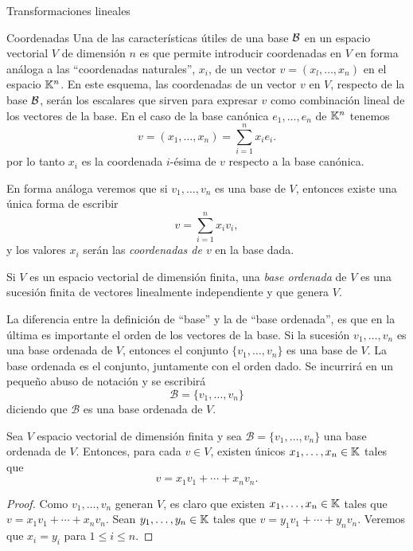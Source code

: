 \begin{chapter}{Transformaciones lineales}
        


    \begin{section}{Coordenadas}\label{seccion-coordenadas}
        Una de las características útiles de una base $\mathcal{B}$ en un espacio vectorial  $V$ de dimensión $n$ es que permite introducir coordenadas en $V$ en forma análoga a las ``coordenadas naturales'', $x_i$, de un vector $v = (x_l,\ldots, x_n)$ en el espacio $\mathbb K^n$. En este esquema, las coordenadas de un vector $v$ en $V$, respecto de la base $\mathcal{B}$, serán los escalares que sirven para expresar $v$ como combinación lineal de los vectores de la base. En  el caso  de la base canónica $e_1,\ldots,e_n$ de $\mathbb K^n$ tenemos
        $$
        v = (x_1,\ldots,x_n) = \sum_{i=1}^{n} x_ie_i.
        $$
        por lo tanto $x_i$  es la coordenada $i$-ésima de $v$ respecto a la base canónica. 
        
        En  forma análoga veremos que si $v_1,\ldots,v_n$  es una base de $V$,  entonces existe una única forma de  escribir 
        $$
        v =  \sum_{i=1}^{n} x_iv_i,
        $$ 
        y los valores  $x_i$  serán las \textit{coordenadas de $v$} en la base dada. 
        
        \begin{definicion}
            Si $V$ es un espacio vectorial de dimensión finita, una \textit{base ordenada} de $V$ es una sucesión finita de vectores linealmente independiente y que genera $V$.
        \end{definicion}
        
        
        La diferencia entre la definición de ``base'' y la de ``base ordenada'',  es que en la última es  importante el orden de los vectores de la base. Si la sucesión $v_1,\ldots,v_n$ es una base ordenada de $V$, entonces el conjunto $\{v_1,\ldots,v_n\}$ es una base de $V$. La base ordenada es el conjunto, juntamente con el orden dado. Se incurrirá en un pequeño abuso de notación y se escribirá
        $$
        \mathcal{B} = \{v_1,\ldots,v_n\}
        $$
        diciendo que $\mathcal{B}$ es una base ordenada de $V$.
        
        \begin{proposicion}
            Sea $V$  espacio vectorial de dimensión finita y sea $\mathcal{B} = \{v_1,\ldots,v_n\}$ una base ordenada de $V$. Entonces, para cada $v \in V$,  existen únicos $x_1,\ldots,x_n \in \mathbb K$ tales que $$v =   x_1v_1 + \cdots +x_nv_n.$$
        \end{proposicion}
        \begin{proof}
            Como $v_1,\ldots,v_n$  generan $V$,  es claro que existen $x_1,\ldots,x_n \in \mathbb K$ tales que $v =   x_1v_1 + \cdots +x_nv_n$. Sean $y_1,\ldots,y_n \in \mathbb K$ tales que $v =   y_1v_1 + \cdots +y_nv_n$. Veremos que $x_i = y_i$ para $1 \le i \le n$.
            

\end{proof}
\end{section}
\end{chapter}
